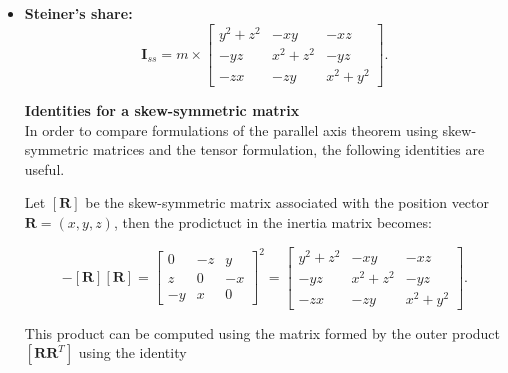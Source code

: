 \documentclass[10pt,b5paper,titlepage]{book}
\begin{document}
\begin{itemize}
    \item \textbf{Steiner's share:}\\

        \begin{equation}
            \mathbf{I}_{ss} = m \times \begin{bmatrix}
                y^{2} + z^{2} & -xy & -xz \\
                -yz & x^{2} + z^{2} & -yz \\
                -zx & -zy & x^{2} + y^{2}
            \end{bmatrix}
        .\end{equation}

        \textbf{Identities for a skew-symmetric matrix}\\

        In order to compare formulations of the parallel axis theorem using
        skew-symmetric matrices and the tensor formulation, the following
        identities are useful.

        Let $[\mathbf{R}]$ be the skew-symmetric matrix associated with the
        position vector $\mathbf{R} = (x, y, z)$, then the prodictuct in
        the inertia matrix becomes:

        \begin{equation}
            -[\mathbf{R}][\mathbf{R}] = \begin{bmatrix}
                0 & -z & y \\
                z & 0 & -x \\
                -y & x & 0
            \end{bmatrix}^{2}
            = \begin{bmatrix}
                y^{2} + z^{2} & -xy & -xz \\
                -yz & x^{2} + z^{2} & -yz \\
                -zx & -zy & x^{2} + y^{2}
            \end{bmatrix}
        .\end{equation}

        This product can be computed using the matrix formed by the outer product
        $[\mathbf{R} \mathbf{R}^{T}]$ using the identity


\end{itemize}
\end{document}
